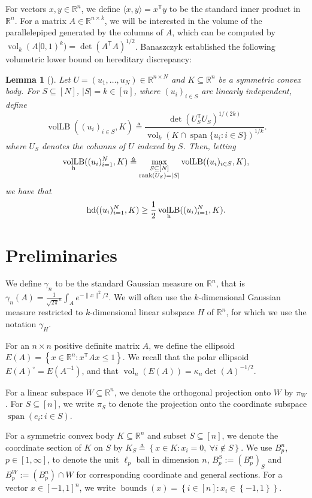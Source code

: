 \documentclass[12pt]{article}
\newtheorem{lemma}{Lemma}
\newcommand{\R}{{\mathbb{R}}}
\newcommand{\T}{\mathsf T}
\newcommand{\eqdef}{\triangleq}
\newcommand{\inner}[2]{\langle #1, #2 \rangle}
\newcommand{\set}[1]{\left\{ #1 \right\}}
\DeclareMathOperator{\vollb}{volLB}
\DeclareMathOperator{\hd}{hd}
\DeclareMathOperator{\vol}{vol}
\DeclareMathOperator{\lspan}{span}
\DeclareMathOperator{\bnds}{bounds}
\begin{document}
For vectors $x,y \in \R^n$, we define $\inner{x}{y} = x^\T y$ to be the standard
inner product in $\R^n$. For a matrix $A \in \R^{n \times k}$, we will be
interested in the volume of the parallelepiped generated by the columns of $A$,
which can be computed by $\vol_k(A[0,1)^k) = \det(A^\T A)^{1/2}$.  Banaszczyk
established the following volumetric lower bound on hereditary discrepancy:

\begin{lemma}[\cite{Bana93}]
\label{eq:vol-lb}
Let $U = (u_1,\dots,u_N) \in \R^{n \times N}$ and $K \subseteq \R^n$ be a
symmetric convex body. For $S \subseteq [N]$, $|S| = k \in [n]$, where $(u_i)_{i
\in S}$ are linearly independent, define  
\begin{equation}
\label{eq:vol-lb}
\vollb((u_i)_{i \in S}, K) 
                         \eqdef \frac{\det(U_S^\T U_S)^{1/(2k)}}{\vol_{k}(K \cap
\lspan\{u_i: i \in S\})^{1/k}}.
\end{equation}
where $U_S$ denotes the columns of $U$ indexed by $S$. Then, letting
\[
\vollb_{\rm h}((u_i)_{i=1}^N, K) \eqdef \max_{\substack{S \subseteq [N] \\ {\rm
rank}(U_S) = |S|}} \vollb((u_i)_{i \in S},K),
\]
we have that
\[
\hd((u_i)_{i=1}^N,K) \geq \frac{1}{2} \vollb_{\rm h}((u_i)_{i=1}^N,K) .
\]
\end{lemma}

\section{Preliminaries}

We define $\gamma_n$ to be the standard Gaussian measure on $\R^n$, that is
$\gamma_n(A) = \frac{1}{\sqrt{2\pi}^n} \int_A e^{-\|x\|^2/2}$. We will often use
the $k$-dimensional Gaussian measure restricted to $k$-dimensional linear
subspace $H$ of $\R^n$, for which we use the notation $\gamma_H$.

For an $n \times n$ positive definite matrix $A$, we define the ellipsoid $E(A)
= \set{x \in \R^n: x^\T A x \leq 1}$. We recall that the polar ellipsoid
$E(A)^\circ = E(A^{-1})$, and that $\vol_n(E(A)) = \kappa_n \det(A)^{-1/2}$.

For a linear subspace $W \subseteq \R^n$, we denote the orthogonal projection
onto $W$ by $\pi_W$. For $S \subseteq [n]$, we write $\pi_S$ to denote the
projection onto the coordinate subspace $\lspan(e_i: i \in S)$.

For a symmetric convex body $K \subseteq \R^n$ and subset $S \subseteq [n]$, we
denote the coordinate section of $K$ on $S$ by $K_S \eqdef \set{x \in K: x_i =
0, ~\forall i \notin S}$. We use $B_p^n$, $p \in [1,\infty]$, to denote the unit
$\ell_p$ ball in dimension $n$, $B_p^S := (B_p^n)_S$ and $B_p^W := (B_p^n) \cap W$
for corresponding coordinate and general sections. For a vector $x \in
[-1,1]^n$, we write $\bnds(x) = \set{i \in [n]: x_i \in \set{-1,1}}$.
\end{document}
